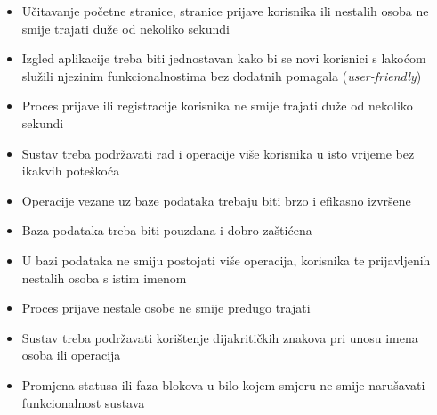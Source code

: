 			 \begin{itemize}
			 	\item Učitavanje početne stranice, stranice prijave korisnika ili nestalih osoba ne smije trajati duže od nekoliko sekundi
			 	\item Izgled aplikacije treba biti jednostavan kako bi se novi korisnici s lakoćom služili njezinim funkcionalnostima bez dodatnih pomagala (\textit{user-friendly})
			 	\item Proces prijave ili registracije korisnika ne smije trajati duže od nekoliko sekundi
			 	\item Sustav treba podržavati rad i operacije više korisnika u isto vrijeme bez ikakvih poteškoća
			 	\item Operacije vezane uz baze podataka trebaju biti brzo i efikasno izvršene
			 	\item Baza podataka treba biti pouzdana i dobro zaštićena
			 	\item U bazi podataka ne smiju postojati više operacija, korisnika te prijavljenih nestalih osoba s istim imenom
			 	\item Proces prijave nestale osobe ne smije predugo trajati
			 	\item Sustav treba podržavati korištenje dijakritičkih znakova pri unosu imena osoba ili operacija
			 	\item Promjena statusa ili faza blokova u bilo kojem smjeru ne smije narušavati funkcionalnost sustava
			 \end{itemize}
			 
			 
			 
	
